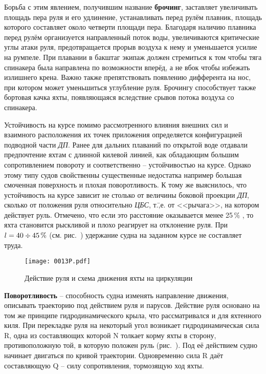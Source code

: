 Борьба с этим явлением, получившим название
\textbf{брочинг}, заставляет увеличивать площадь пера
руля и его удлинение, устанавливать перед рулём плавник, площадь
которого составляет около четверти площади пера. Благодаря наличию
плавника перед рулём организуется направленный поток воды,
увеличиваются критические углы атаки руля, предотвращается прорыв
воздуха к нему и уменьшается усилие на румпеле. При плавании в бакштаг
экипаж должен стремиться к том чтобы тяга спинакера была направлена по
возможности вперёд, а не вбок чтобы избежать излишнего крена. Важно
также препятствовать появлению дифферента на нос, при котором может
уменьшиться углубление руля. Брочингу способствует также бортовая
качка яхты, появляющаяся вследствие срывов потока воздуха со
спинакера.

Устойчивость на курсе помимо рассмотренного влияния внешних сил и
взаимного расположения их точек приложения определяется конфигурацией
подводной части \textit{ДП}. Ранее для дальних плаваний по открытой
воде отдавали предпочтение яхтам с длинной килевой линией, как
обладающим большим сопротивлением повороту и соответственно \---
устойчивостью на курсе. Однако этому типу судов свойственны
существенные недостатка например большая смоченная поверхность и
плохая поворотливость. К тому же выяснилось, что устойчивость на курсе
зависит не столько от величины боковой проекции \textit{ДП}, сколько
от положения руля относительно \textit{ЦБС}, т.\=,е. от <<рычага>>, на
котором действует руль. Отмечено, что если это расстояние оказывается
менее 25\,\% \lkvl, то яхта становится рыскливой и плохо реагирует на
отклонение руля. При $l = 40 \div 45\,\%$ \lkvl (см. рис.~)
удержание судна на заданном курсе не составляет труда.

\begin{figure*}[htb]
  \centering
  \texttt{[image: 0013P.pdf]}
  \caption{Действие руля и схема движения яхты на циркуляции}
  \label{fig:13}
\end{figure*}

\textbf{Поворотливость} \--- способность судна
изменять направление движения, описывать траекторию под действием руля
и парусов. Действие руля основано на том же принципе
гидродинамического крыла, что рассматривался и для яхтенного киля. При
перекладке руля на некоторый угол возникает гидродинамическая сила \ve
R, одна из составляющих которой \ve N толкает корму яхты в сторону,
противоположную той, в которую положен руль (рис.~). Под её
действием судно начинает двигаться по кривой траектории. Одновременно
сила \ve R даёт составляющую \ve Q \--- силу сопротивления, тормозящую
ход яхты.

